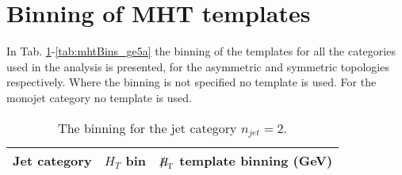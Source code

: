 \section{Binning of MHT templates}
\label{sec:mhtBinning}
In Tab. \ref{tab:mhtBins_eq2j}-\ref{tab:mhtBins_ge5a} the binning of the \MHT templates for all the 
categories used in the analysis is presented, for the asymmetric and symmetric topologies respectively. 
Where the binning is not specified no template is used. 
For the monojet category no template is used. 

\begin{table}[h!]
  \scriptsize
  \centering
  \caption{The \MHT binning for the jet category $n_{jet} = 2$. 
  \label{tab:mhtBins_eq2j}}
  \begin{tabular}{ lll }
    Jet category & $H_{T}$ bin & $\MHT$ template binning (GeV) \\ \hline


\end{tabular}
\end{table}
